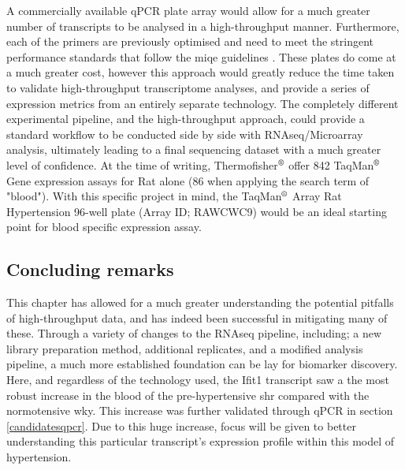 A commercially available qPCR plate array would allow for a much greater number of transcripts to be analysed in a high-throughput manner. Furthermore, each of the primers are previously optimised and need to meet the stringent performance standards that follow the \acrfull{miqe} guidelines \cite{10.1371/journal.pone.0190152}. These plates do come at a much greater cost, however this approach would greatly reduce the time taken to validate high-throughput transcriptome analyses, and provide a series of expression metrics from an entirely separate technology. The completely different experimental pipeline, and the high-throughput approach, could provide a standard workflow to be conducted side by side with RNAseq/Microarray analysis, ultimately leading to a final sequencing dataset with a much greater level of confidence. At the time of writing, Thermofisher$\textsuperscript{\textregistered}$ offer 842 TaqMan$\textsuperscript{\textregistered}$ Gene expression assays for Rat alone (86 when applying the search term of "blood"). With this specific project in mind, the TaqMan$\textsuperscript{\textregistered}$ Array Rat Hypertension 96-well plate (Array ID; RAWCWC9) would be an ideal starting point for blood specific expression assay.

\subsection{Concluding remarks}

This chapter has allowed for a much greater understanding the potential pitfalls of high-throughput data, and has indeed been successful in mitigating many of these. Through a variety of changes to the RNAseq pipeline, including; a new library preparation method, additional replicates, and a modified analysis pipeline, a much more established foundation can be lay for biomarker discovery. 
Here, and regardless of the technology used, the Ifit1 transcript saw a the most robust increase in the blood of the pre-hypertensive \acrshort{shr} compared with the normotensive \acrshort{wky}. This increase was further validated through qPCR in section \ref{candidatesqpcr}. Due to this huge increase, focus will be given to better understanding this particular transcript's expression profile within this model of hypertension.






